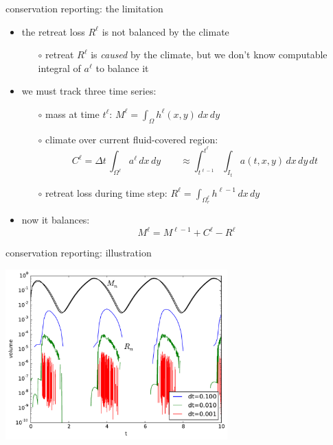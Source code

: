 \documentclass[xcolor={dvipsnames}]{beamer}
\begin{document}
\begin{frame}{conservation reporting: the limitation}

\begin{itemize}
\item \alert{the retreat loss $R^\ell$ is not balanced by the climate}
  \begin{itemize}
  \item[$\circ$] retreat $R^\ell$ is \emph{caused} by the climate, but we don't know computable integral of $a^\ell$ to balance it
  \end{itemize}
\item we must track \alert{three} time series:
  \begin{itemize}
  \item[$\circ$] mass at time $t^\ell$: \qquad $M^\ell = \int_\Omega h^\ell(x,y)\,dx\,dy$

  \smallskip
  \item[$\circ$] climate over current fluid-covered region:
     $$C^\ell = \Delta t\, \int_{\Omega^\ell} a^\ell \,dx\,dy \qquad \approx \int_{t^{\ell-1}}^{t^\ell} \int_{I_t} a(t,x,y) \,dx\,dy\,dt$$
  \item[$\circ$] retreat loss during time step: \qquad $R^\ell = \int_{\Omega^\ell_r} h^{\ell-1} \,dx\,dy$
  \end{itemize}
\item now it balances:
     $$M^\ell = M^{\ell-1} + C^\ell - R^\ell$$
\end{itemize}
\end{frame}


\begin{frame}{conservation reporting: illustration}

\begin{center}
\vspace{-3.3mm}


\vspace{-1.1mm}
\includegraphics[width=0.64\textwidth,keepaspectratio=true]{masstimeseries} \, \phantom{!}
\end{center}
\end{frame}
\end{document}
